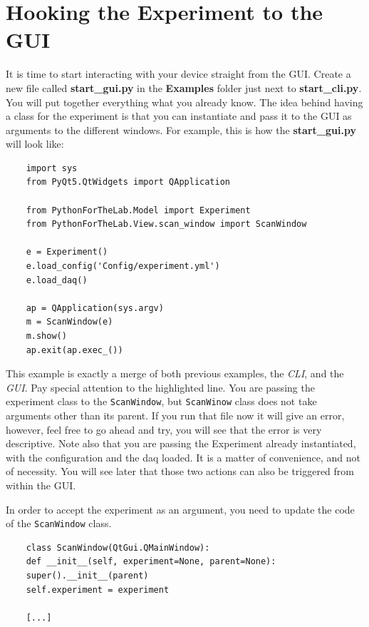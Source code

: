 \section{Hooking the Experiment to the GUI}\label{hooking-the-experiment-to-the-gui}
It is time to start interacting with your device straight from the
{GUI}. Create a new file called \textbf{start\_gui.py} in the
\textbf{Examples} folder just next to \textbf{start\_cli.py}. You will
put together everything what you already know. The idea behind having a
class for the experiment is that you can instantiate and pass it to the
{GUI} as arguments to the different windows. For example, this is how
the \textbf{start\_gui.py} will look like:

\begin{verbatim}
    import sys
    from PyQt5.QtWidgets import QApplication

    from PythonForTheLab.Model import Experiment
    from PythonForTheLab.View.scan_window import ScanWindow

    e = Experiment()
    e.load_config('Config/experiment.yml')
    e.load_daq()

    ap = QApplication(sys.argv)
    m = ScanWindow(e)
    m.show()
    ap.exit(ap.exec_())
\end{verbatim}

This example is exactly a merge of both previous examples, the
\emph{CLI}, and the \emph{GUI}. Pay special attention to the
highlighted line. You are passing the experiment class to the
\texttt{ScanWindow}, but \texttt{ScanWinow} class does not take
arguments other than its parent. If you run that file now it will give
an error, however, feel free to go ahead and try, you will see that the
error is very descriptive. Note also that you are passing the Experiment
already instantiated, with the configuration and the daq loaded. It is a
matter of convenience, and not of necessity. You will see later that
those two actions can also be triggered from within the {GUI}.

In order to accept the experiment as an argument, you need to update the
code of the \texttt{ScanWindow} class.

\begin{verbatim}
    class ScanWindow(QtGui.QMainWindow):
    def __init__(self, experiment=None, parent=None):
    super().__init__(parent)
    self.experiment = experiment

    [...]
\end{verbatim}

